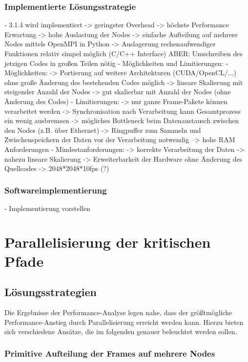 \subsection{Implementierte Lösungsstrategie}

- 3.1.4 wird implementiert
-> geringster Overhead
-> höchste Performance Erwartung
-> hohe Auslastung der Nodes
-> einfache Aufteilung auf mehrere Nodes mittels OpenMPI in Python
-> Auslagerung rechenaufwendiger Funktionen relativ simpel möglich (C/C++ Interface)
ABER: Umschreiben des jetzigen Codes in großen Teilen nötig
- Möglichkeiten und Limitierungen:
- Möglichkeiten:
-> Portierung auf weitere Architekturen (CUDA/OpenCL/...) ohne große Änderung des bestehenden Codes möglich
-> lineare Skalierung mit steigender Anzahl der Nodes
-> gut skalierbar mit Anzahl der Nodes (ohne Änderung des Codes)
- Limitierungen:
-> nur ganze Frame-Pakete können verarbeitet werden
-> Synchronisation nach Verarbeitung kann Gesamtprozess ein wenig ausbremsen
-> mögliches Bottleneck beim Datenaustausch zwischen den Nodes (z.B. über Ethernet)
-> Ringpuffer zum Sammeln und Zwischenspeichern der Daten vor der Verarbeitung notwendig --> hohe RAM Anforderungen
- Mindestanforderungen:
-> korrekte Verarbeitung der Daten
-> nahezu lineare Skalierung
-> Erweiterbarkeit der Hardware ohne Änderung des Quellcodes
-> 2048*2048*10fps (?)

\subsection{Softwareimplementierung}

- Implementierung vorstellen

\chapter{Parallelisierung der kritischen Pfade}

\section{Lösungsstrategien}

Die Ergebnisse der Performance-Analyse legen nahe, dass der größtmögliche Performance-Anstieg durch Parallelisierung erreicht werden kann. Hierzu bieten sich verschiedene Ansätze, die im folgenden genauer beleuchtet werden sollen. 

\subsection{Primitive Aufteilung der Frames auf mehrere Nodes}
\label{subsec:primitive_splitting}


